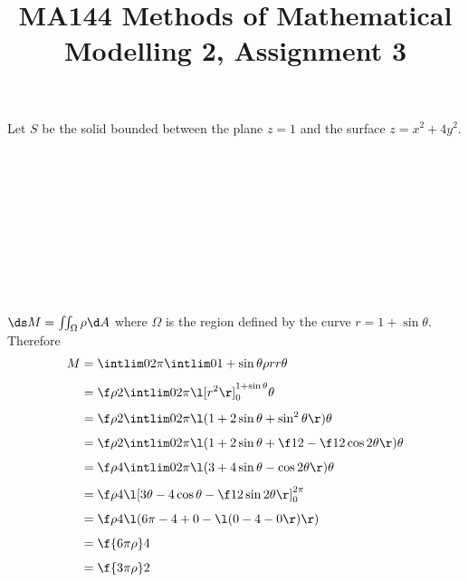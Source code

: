 \documentclass[a4paper]{article}
\title{MA144 Methods of Mathematical Modelling 2, Assignment 3}
\begin{document}
\maketitle

\setlength{\parindent}{0em}
\setlength{\parskip}{1em}


Let $S$ be the solid bounded between the plane $z=1$ and the surface $z = x^2 + 4y^2$.

\subsection{~}
\subsection{~}



\subsection{~}

$\ds M = \iint_\Omega \rho \d A$ where $\Omega$ is the region defined by the curve $r = 1 + \sin \theta$. Therefore \begin{align*}
M &= \intlim 0{2\pi} {\intlim 0 {1 + \sin \theta} {\rho r} r} \theta\\[1ex]
&= \f\rho2 \intlim 0{2\pi} {\l[ r^2 \r]_0^{1 + \sin \theta}} \theta\\[1ex]
&= \f\rho2 \intlim 0{2\pi} {\l( 1 + 2\sin\theta + \sin^2 \theta \r)} \theta\\[1ex]
&= \f\rho2 \intlim 0{2\pi} {\l( 1 + 2\sin\theta + \f12 - \f12 \cos 2\theta \r)} \theta\\[1ex]
&= \f\rho4 \intlim 0{2\pi} {\l( 3 + 4\sin\theta - \cos 2\theta \r)} \theta\\[1ex]
&= \f\rho4 \l[ 3\theta - 4\cos\theta - \f12 \sin 2\theta \r]_0^{2\pi}\\[1ex]
&= \f\rho4 \l( 6\pi - 4 + 0 - \l( 0 - 4 - 0 \r) \r)\\[1ex]
&= \f{6\pi \rho}4\\[1ex]
&= \f{3\pi \rho}2\\[1ex]
\end{align*}

\subsection{~}
\end{document}
